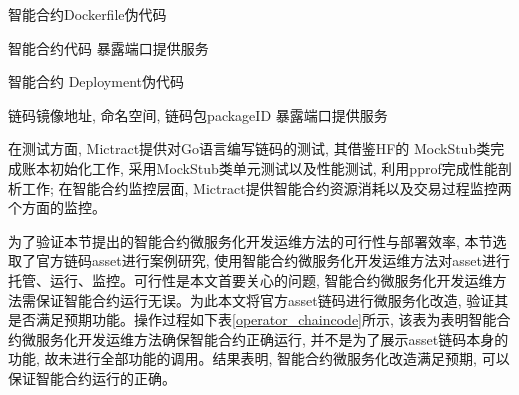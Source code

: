 \begin{algorithm}[!htbp]
    \caption{\footnotesize 智能合约Dockerfile伪代码}
    \label{cc_dockerfile}
    {\footnotesize
    \begin{algorithmic}
        \renewcommand{\algorithmicrequire}{ \textbf{Input:}}
        \REQUIRE  
        智能合约代码
        \renewcommand{\algorithmicensure}{\textbf{Output:}}
        \ENSURE
        暴露端口提供服务

    \end{algorithmic}
    }
\end{algorithm}

\begin{algorithm}[!htbp]
    \caption{\footnotesize 智能合约 Deployment伪代码}
    \label{code4}
    {\footnotesize
    \begin{algorithmic}
        \renewcommand{\algorithmicrequire}{ \textbf{Input:}}
        \REQUIRE  
        链码镜像地址, 命名空间, 链码包packageID
        \renewcommand{\algorithmicensure}{\textbf{Output:}}
        \ENSURE
        暴露端口提供服务

    \end{algorithmic}
    }
\end{algorithm}

在测试方面, Mictract提供对Go语言编写链码的测试, 其借鉴HF的 MockStub类完成账本初始化工作, 采用MockStub类单元测试以及性能测试, 利用pprof\footnotemark[1]完成性能剖析工作; 在智能合约监控层面, Mictract提供智能合约资源消耗以及交易过程监控两个方面的监控。

为了验证本节提出的智能合约微服务化开发运维方法的可行性与部署效率, 本节选取了官方链码asset进行案例研究, 使用智能合约微服务化开发运维方法对asset进行托管、运行、监控。可行性是本文首要关心的问题, 智能合约微服务化开发运维方法需保证智能合约运行无误。为此本文将官方asset链码进行微服务化改造, 验证其是否满足预期功能。操作过程如下表\ref{operator_chaincode}所示, 该表为表明智能合约微服务化开发运维方法确保智能合约正确运行, 并不是为了展示asset链码本身的功能, 故未进行全部功能的调用。结果表明, 智能合约微服务化改造满足预期, 可以保证智能合约运行的正确。

